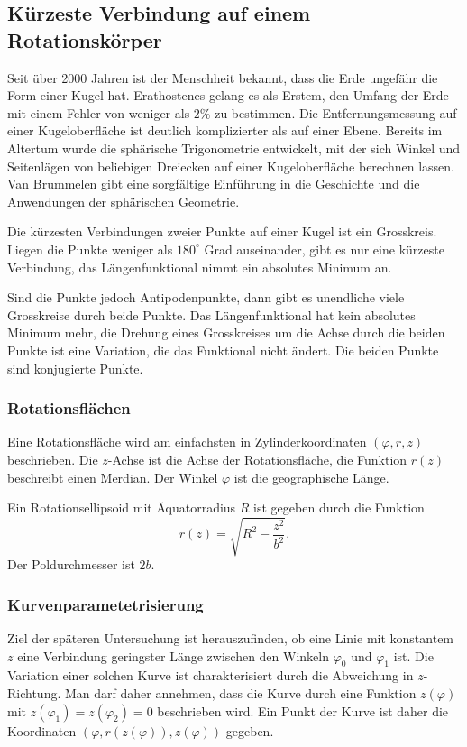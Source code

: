 %
%
\subsection{Kürzeste Verbindung auf einem Rotationskörper}
Seit über 2000 Jahren ist der Menschheit bekannt, dass die Erde
ungefähr die Form einer Kugel hat.
Erathostenes gelang es als Erstem, den Umfang der Erde mit
einem Fehler von weniger als $2\%$ zu bestimmen.
Die Entfernungsmessung auf einer Kugeloberfläche ist deutlich
komplizierter als auf einer Ebene.
Bereits im Altertum wurde die sphärische Trigonometrie entwickelt,
mit der sich Winkel und Seitenlägen von beliebigen Dreiecken auf
einer Kugeloberfläche berechnen lassen.
Van Brummelen \cite{buch:heavenly} gibt eine sorgfältige Einführung
in die Geschichte und die Anwendungen der sphärischen Geometrie.

\begin{beispiel}
Die kürzesten Verbindungen zweier Punkte auf einer Kugel ist ein
Grosskreis.
Liegen die Punkte weniger als $180^\circ$ Grad auseinander, gibt es
nur eine kürzeste Verbindung, das Längenfunktional nimmt ein
absolutes Minimum an.

Sind die Punkte jedoch Antipodenpunkte, dann gibt es unendliche viele
Grosskreise durch beide Punkte.
Das Längenfunktional hat kein absolutes Minimum mehr, die Drehung eines
Grosskreises um die Achse durch die beiden Punkte ist eine Variation,
die das Funktional nicht ändert.
Die beiden Punkte sind konjugierte Punkte.
\end{beispiel}

%
%
\subsubsection{Rotationsflächen}
Eine Rotationsfläche wird am einfachsten in Zylinderkoordinaten
$(\varphi,r,z)$
beschrieben.
Die $z$-Achse ist die Achse der Rotationsfläche, die Funktion $r(z)$
beschreibt einen Merdian.
Der Winkel $\varphi$ ist die geographische Länge.

\begin{beispiel}
Ein Rotationsellipsoid mit Äquatorradius $R$ ist gegeben durch die Funktion
\[
r(z)
=
\sqrt{R^2-\frac{z^2}{b^2}}.
\]
Der Poldurchmesser ist $2b$.
\end{beispiel}

%
%
\subsubsection{Kurvenparametetrisierung}
Ziel der späteren Untersuchung ist herauszufinden, ob eine Linie
mit konstantem $z$ eine Verbindung geringster Länge zwischen den
Winkeln $\varphi_0$ und $\varphi_1$ ist.
Die Variation einer solchen Kurve ist charakterisiert durch die
Abweichung in $z$-Richtung.
Man darf daher annehmen, dass die Kurve durch eine Funktion $z(\varphi)$
mit $z(\varphi_1)=z(\varphi_2)=0$ beschrieben wird.
Ein Punkt der Kurve ist daher die Koordinaten
$(\varphi, r(z(\varphi)), z(\varphi))$
gegeben.

